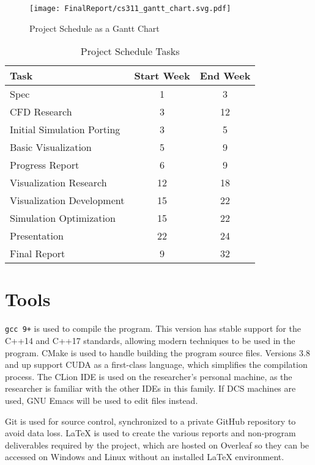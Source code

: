 \begin{figure}[ht]
    \centering
    \texttt{[image: FinalReport/cs311\_gantt\_chart.svg.pdf]}
    \caption{Project Schedule as a Gantt Chart}
    \label{fig:project schedule gantt}
\end{figure}

\begin{table}[ht]
    \centering
    \begin{tabular}{l|c|c}
    \textbf{Task} & \textbf{Start Week} & \textbf{End Week} \\
    \hline
    Spec & 1 & 3 \\
    CFD Research & 3 & 12 \\
    Initial Simulation Porting & 3 & 5 \\
    Basic Visualization & 5 & 9 \\
    Progress Report & 6 & 9 \\
    Visualization Research & 12 & 18 \\
    Visualization Development & 15 & 22 \\
    Simulation Optimization & 15 & 22 \\
    Presentation & 22 & 24 \\
    Final Report & 9 & 32 \\
    \end{tabular}
    \caption{Project Schedule Tasks}
    \label{tab:project schedule table}
\end{table}

\section{Tools}
\label{sec:ProjManagementTools}
\verb|gcc 9+|\cite{tool:Gcc9} is used to compile the program.
This version has stable support for the C++14 and C++17 standards\cite{tool:GccCxxStatus}, allowing modern techniques to be used in the program.
CMake\cite{tool:Cmake} is used to handle building the program source files.
Versions 3.8 and up support CUDA as a first-class language\cite{tool:CmakeCUDAFirstClass}, which simplifies the compilation process.
The CLion IDE\cite{tool:CLion} is used on the researcher's personal machine, as the researcher is familiar with the other IDEs in this family.
If DCS machines are used, GNU Emacs\cite{tool:Emacs} will be used to edit files instead.

Git\cite{tool:Git} is used for source control, synchronized to a private GitHub\cite{tool:GitHub} repository to avoid data loss.
\LaTeX{}\cite{tool:Latex} is used to create the various reports and non-program deliverables required by the project, which are hosted on Overleaf\cite{tool:Overleaf} so they can be accessed on Windows and Linux without an installed \LaTeX{} environment.
 
